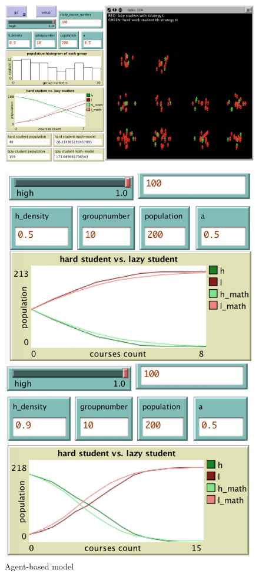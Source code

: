 \documentclass[a4paper, 12pt]{article}
\begin{document}
\begin{figure}[!h]
\centering
	\begin{minipage}[t]{0.6\textwidth}
		\centering
		\includegraphics[width=1\linewidth]{./figures/agent}
		\begin{small}
			\centering
			\vspace{-6mm}
			\caption{\footnotesize Agent-based model}
		\end{small}
		\label{fig1}
	\end{minipage}
	\begin{minipage}[t]{0.25\textwidth}
		\centering
		\includegraphics[width=1\linewidth]{./figures/agent-comp}

\end{minipage}
\end{figure}
\end{document}
